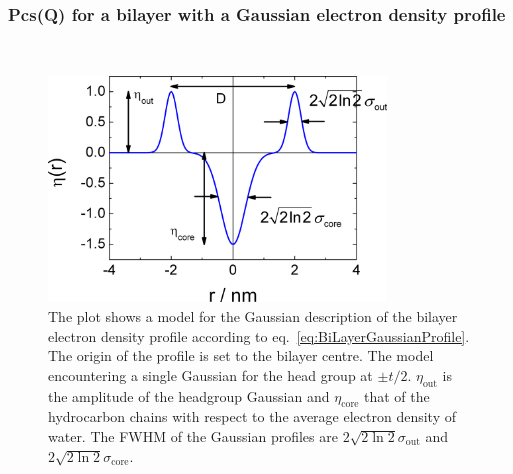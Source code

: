 \clearpage

\subsubsection{Pcs(Q) for a bilayer with a Gaussian electron density profile} ~\\
\label{plugin:Pcs:GaussianProfile}

\begin{figure}[htb]
\begin{center}
\includegraphics[width=0.8\textwidth,height=0.55\textwidth]{../images/form_factor/anisotropic/BiLayerGauss_Profile.png}
\end{center}
\caption{
The plot shows a model for the Gaussian description of the bilayer electron density profile according to
eq.\ \ref{eq:BiLayerGaussianProfile}.
The origin of the profile is set to the bilayer centre. The model encountering a single Gaussian for the head
group at $\pm t/2$. $\eta_\textrm{out}$ is the amplitude of the headgroup Gaussian and $\eta_\textrm{core}$ that of
the hydrocarbon chains with respect to the average electron density of water. The FWHM of the Gaussian profiles are
$2\sqrt{2\ln 2}\sigma_\textrm{out}$ and $2\sqrt{2\ln 2}\sigma_\textrm{core}$.}
\label{fig:bilayerprofile}
\end{figure}


